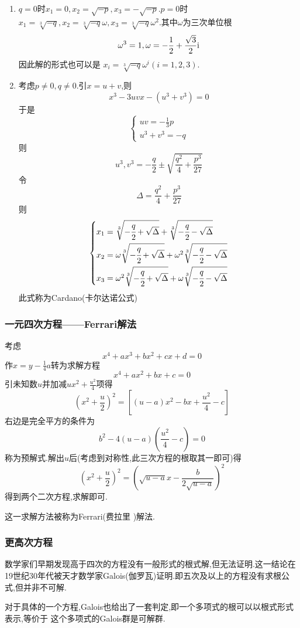 \begin{enumerate}[label=\arabic*)]
    \item $q=0$时$x_1=0,x_2=\sqrt{-p},x_3=-\sqrt{-p}.p=0$时$x_1=\sqrt[3]{-q},x_2=\sqrt[3]{-q}\omega,x_3=\sqrt[3]{-q}\omega^2.$其中$\omega$为三次单位根
          \[
              \omega ^3=1,\omega = -\frac{1}{2}+\frac{\sqrt{3}}{2}\mathrm{i}
          \]
          因此解的形式也可以是
          $x_i=\sqrt[3]{-q}\omega^i\left(i=1,2,3
              \right)$.
    \item 考虑$p\neq 0,q\neq 0$.引$x=u+v$,则
          \[
              x^3-3uvx-\left(u^3+v^3\right)=0
          \]
          于是\[
              \begin{cases*}
                  uv=-\frac{1}{3}p \\
                  u^3+v^3=-q
              \end{cases*}
          \]
          则\[
              u^3,v^3=-\frac{q}{2}\pm \sqrt{\frac{q^2}{4}+\frac{p^3}{27}}
          \]
          令\[
              \Delta = \frac{q^2}{4}+\frac{p^3}{27}
          \]
          则
          \[
              \begin{cases*}
                  x_1=\sqrt[3]{-\cfrac{q}{2}+\sqrt{\Delta}}+\sqrt[3]{-\cfrac{q}{2}-\sqrt{\Delta}}                \\
                  x_2=\omega \sqrt[3]{-\cfrac{q}{2}+\sqrt{\Delta}}+\omega^2\sqrt[3]{-\cfrac{q}{2}-\sqrt{\Delta}} \\
                  x_3=\omega^2 \sqrt[3]{-\cfrac{q}{2}+\sqrt{\Delta}}+\omega\sqrt[3]{-\cfrac{q}{2}-\sqrt{\Delta}}
              \end{cases*}
          \]
          此式称为Cardano(卡尔达诺公式)
\end{enumerate}

\subsubsection{一元四次方程——Ferrari解法}
考虑\[
    x^4+ax^3+bx^2+cx+d=0
\]
作$\displaystyle
    x=y-\frac{1}{4}a$转为求解方程
\[
    x^4+ax^2+bx+c=0
\]
引未知数$u$并加减$\displaystyle
    ux^2+\frac{u^2}{4}$项得
\[
    \left(x^2+\frac{u}{2}\right)^2=\left[
        \left(u-a\right)x^2-bx+\frac{u^2}{4}-c
        \right]
\]
右边是完全平方的条件为
\[
    b^2-4\left(u-a\right)\left(\frac{u^2}{4}-c\right)=0
\]
称为预解式.解出$u$后(考虑到对称性,此三次方程的根取其一即可)得\[
    \left(x^2+\frac{u}{2}\right)^2=
    \left(
    \sqrt{u-a}x-\frac{b}{2\sqrt{u-a}}
    \right)^2
\]
得到两个二次方程,求解即可.

这一求解方法被称为Ferrari(费拉里
)解法.
\subsubsection{更高次方程}
数学家们早期发现高于四次的方程没有一般形式的根式解,但无法证明.这一结论在19世纪30年代被天才数学家Galois(伽罗瓦)证明.即五次及以上的方程没有求根公式,但并非不可解.

对于具体的一个方程,Galois也给出了一套判定,即一个多项式的根可以以根式形式表示,等价于
这个多项式的Galois群是可解群.